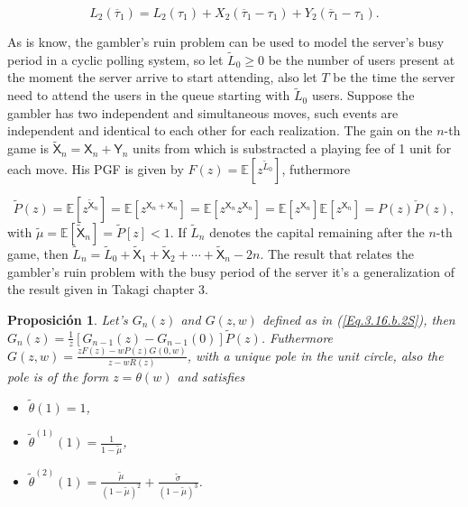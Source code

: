 \documentclass{article}
\newtheorem{Prop}{Proposición}
\newcommand{\esp}{\mathbb{E}}
\begin{document}
\begin{equation}\label{Eq.UsuariosTotalesZ2}
L_{2}\left(\overline{\tau}_{1}\right)=L_{2}\left(\tau_{1}\right)+X_{2}\left(\overline{\tau}_{1}-\tau_{1}\right)+Y_{2}\left(\overline{\tau}_{1}-\tau_{1}\right).
\end{equation}

As is know, the gambler's ruin problem can be used to model the server's busy period in a cyclic polling system, so let $\tilde{L}_{0}\geq0$ be the number of users present at the moment the server arrive to start attending, also let $T$ be the time the server need to attend the users in the queue starting with $\tilde{L}_{0}$ users. Suppose the gambler has two independent and simultaneous moves, such events are independent and identical to each other for each realization. The gain on the $n$-th game is $\tilde{\mathsf{X}}_{n}=\mathsf{X}_{n}+\mathsf{Y}_{n}$ units from which is substracted a playing fee of 1 unit for each move. His PGF is given by $F\left(z\right)=\esp\left[z^{\tilde{L}_{0}}\right]$, futhermore

$$\tilde{P}\left(z\right)=\esp\left[z^{\tilde{\mathsf{X}}_{n}}\right]=\esp\left[z^{\mathsf{X}_{n}+\mathsf{X}_{n}}\right]=\esp\left[z^{\mathsf{X}_{n}}z^{\mathsf{X}_{n}}\right]=\esp\left[z^{\mathsf{X}_{n}}\right]\esp\left[z^{\mathsf{X}_{n}}\right]=P\left(z\right)\check{P}\left(z\right),$$ with $\tilde{\mu}=\esp\left[\tilde{\mathsf{X}}_{n}\right]=\tilde{P}\left[z\right]<1$. If  $\tilde{L}_{n}$ denotes the capital remaining after the $n$-th game, then $\tilde{L}_{n}=\tilde{L}_{0}+\tilde{\mathsf{X}}_{1}+\tilde{\mathsf{X}}_{2}+\cdots+\tilde{\mathsf{X}}_{n}-2n$. The result that relates the gambler's ruin problem with the busy period of the server it's a generalization of the result given in Takagi \cite{Takagi} chapter 3.

\begin{Prop}
Let's $G_{n}\left(z\right)$ and $G\left(z,w\right)$ defined as in 
(\ref{Eq.3.16.b.2S}), then $G_{n}\left(z\right)=\frac{1}{z}\left[G_{n-1}\left(z\right)-G_{n-1}\left(0\right)\right]\tilde{P}\left(z\right)$. Futhermore $G\left(z,w\right)=\frac{zF\left(z\right)-wP\left(z\right)G\left(0,w\right)}{z-wR\left(z\right)}$, with a unique pole in the unit circle, also the pole is of the form $z=\theta\left(w\right)$ and satisfies 
\begin{multicols}{3}
\begin{itemize}
\item[i)]$\tilde{\theta}\left(1\right)=1$,

\item[ii)] $\tilde{\theta}^{(1)}\left(1\right)=\frac{1}{1-\tilde{\mu}}$,

\item[iii)]
$\tilde{\theta}^{(2)}\left(1\right)=\frac{\tilde{\mu}}{\left(1-\tilde{\mu}\right)^{2}}+\frac{\tilde{\sigma}}{\left(1-\tilde{\mu}\right)^{3}}$.
\end{itemize}
\end{multicols}
\end{Prop}
%
\end{document}

